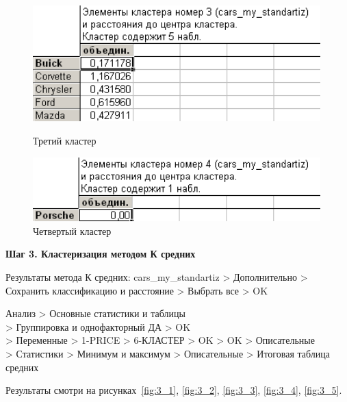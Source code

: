 \begin{figure}[!h]
  \centering
  \begin{minipage}{0.49\textwidth}
    \centering

    \includegraphics[width=0.99\textwidth]
    {inc/cars_my/2.7.PNG}

    \caption{Третий кластер}
    \label{fig:2_7}
  \end{minipage}
  \begin{minipage}{0.49\textwidth}
    \centering

    \includegraphics[width=0.99\textwidth]
    {inc/cars_my/2.8.PNG}

    \caption{Четвертый кластер}
    \label{fig:2_8}
  \end{minipage}
\end{figure}

\newpage

\begin{center}
  \textbf{Шаг 3. Кластеризация методом К средних}
\end{center}

Результаты метода К средних: cars\_my\_standartiz > Дополнительно > Сохранить классификацию и расстояние > Выбрать все > OK

Анализ > Основные статистики и таблицы\\
> Группировка и однофакторный ДА > OK\\
> Переменные > 1-PRICE > 6-КЛАСТЕР > OK > OK > Описательные\\
> Статистики > Минимум и максимум > Описательные > Итоговая таблица средних

Результаты смотри на рисунках~\ref{fig:3_1}, \ref{fig:3_2}, \ref{fig:3_3}, \ref{fig:3_4}, \ref{fig:3_5}.

